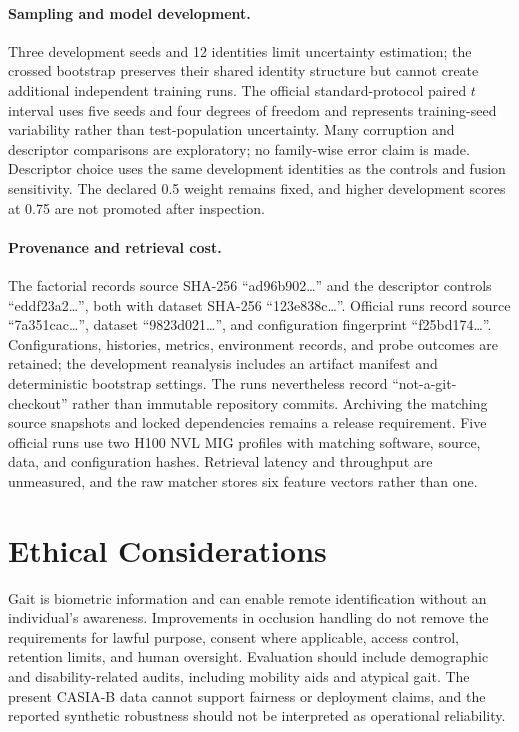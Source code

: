 \documentclass[pdflatex,iicol,sn-apa]{sn-jnl}
\begin{document}
\paragraph{Sampling and model development.}
Three development seeds and 12 identities limit uncertainty estimation; the
crossed bootstrap preserves their shared identity structure but cannot create
additional independent training runs. The official standard-protocol paired
$t$ interval uses five seeds and four degrees of freedom and represents
training-seed variability rather than test-population uncertainty. Many
corruption and descriptor comparisons are exploratory; no family-wise error
claim is made. Descriptor choice uses the same development identities as the
controls and fusion sensitivity. The declared 0.5 weight remains fixed, and
higher development scores at 0.75 are not promoted after inspection.

\paragraph{Provenance and retrieval cost.}
The factorial records source SHA-256 ``ad96b902\ldots'' and the descriptor
controls ``eddf23a2\ldots'', both with dataset SHA-256 ``123e838c\ldots''.
Official runs record source ``7a351cac\ldots'', dataset ``9823d021\ldots'',
and configuration fingerprint ``f25bd174\ldots''. Configurations, histories,
metrics, environment records, and probe outcomes are retained; the development
reanalysis includes an artifact manifest and deterministic bootstrap settings.
The runs nevertheless record ``not-a-git-checkout'' rather than immutable
repository commits. Archiving the matching source snapshots and locked
dependencies remains a release requirement. Five official runs use two H100
NVL MIG profiles with matching software, source, data, and configuration hashes.
Retrieval latency and throughput are unmeasured, and the raw matcher stores six
feature vectors rather than one.

\section{Ethical Considerations}

Gait is biometric information and can enable remote identification without an
individual's awareness. Improvements in occlusion handling do not remove the
requirements for lawful purpose, consent where applicable, access control,
retention limits, and human oversight. Evaluation should include demographic
and disability-related audits, including mobility aids and atypical gait. The
present CASIA-B data cannot support fairness or deployment claims, and the
reported synthetic robustness should not be interpreted as operational
reliability.
\end{document}
